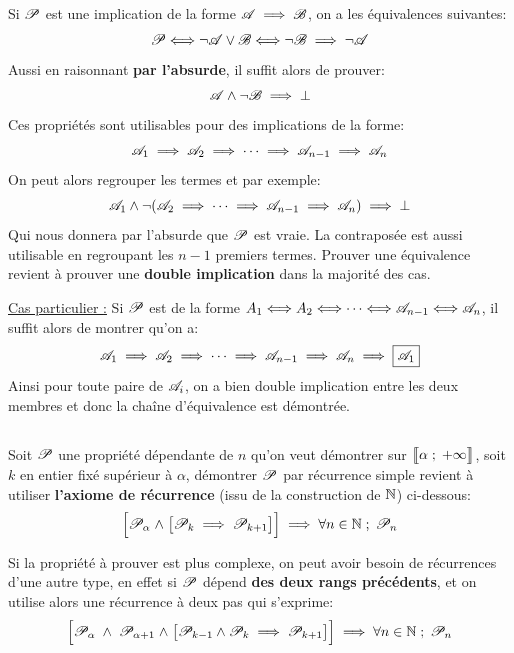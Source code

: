 \subsection*{}
Si \(\P\) est une implication de la forme \(\A \implies \B\), on a les équivalences suivantes:
\[
   \P \Longleftrightarrow \lnot \A \lor \B \Longleftrightarrow \lnot \B \implies \lnot \A
\]
Aussi en raisonnant \textbf{par l'absurde}, il suffit alors de prouver:
\[
   \A \land \lnot \B \implies \bot 
\]
Ces propriétés sont utilisables pour des implications de la forme:
\[
   \A_1 \implies \A_2 \implies \cdots \implies \A_{n-1} \implies \A_n
\]
On peut alors regrouper les termes et par exemple:
\[
   \A_1 \land \lnot(\A_2 \implies \cdots \implies \A_{n-1} \implies \A_n) \implies \bot
\]
Qui nous donnera par l'absurde que \(\P\) est vraie. La contraposée est aussi utilisable en regroupant les \(n-1\) premiers termes.
Prouver une équivalence revient à prouver une \textbf{double implication} dans la majorité des cas.\<

\underline{Cas particulier {:}}
Si \(\P\) est de la forme \( A_1 \Longleftrightarrow A_2 \Longleftrightarrow \cdots \Longleftrightarrow \A_{n-1} \Longleftrightarrow \A_n \), il suffit alors de montrer qu'on a:
\[
   \A_1 \implies \A_2 \implies \cdots \implies \A_{n-1} \implies \A_n \implies \boxed{\A_1}
\]
Ainsi pour toute paire de \(\A_i\), on a bien double implication entre les deux membres et donc la chaîne d'équivalence est démontrée.
\subsection*{}
Soit \(\P\) une propriété dépendante de \(n\) qu'on veut démontrer sur \(\inticc{\alpha}{+\infty}\), soit \(k\) en entier fixé supérieur à \(\alpha\), démontrer \(\P\) par récurrence simple revient à utiliser \textbf{l'axiome de récurrence} (issu de la construction de \(\N\)) ci-dessous:
\[
   \Bigr[ \P_{\alpha} \; \land \; \bigr[ \P_{k} \implies \P_{k+1} \bigr] \Bigr] \implies \forall n \in \N \; ; \; \P_n   
\]

Si la propriété à prouver est plus complexe, on peut avoir besoin de récurrences d'une autre type, en effet si \(\P\) dépend \textbf{des deux rangs précédents}, et on utilise alors une récurrence à deux pas qui s'exprime:
\[
   \Bigr[ \P_{\alpha} \; \land \; \P_{\alpha + 1} \; \land \; \bigr[ \P_{k-1}  \land \P_{k}\implies \P_{k+1} \bigr] \Bigr] \implies \forall n \in \N \; ; \; \P_n   
\]

